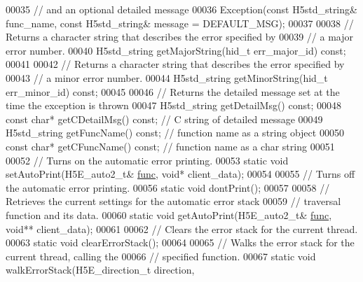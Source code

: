 \begin{DoxyCode}
00035         \textcolor{comment}{// and an optional detailed message}
00036         Exception(\textcolor{keyword}{const} H5std\_string& func\_name, \textcolor{keyword}{const} H5std\_string& message = DEFAULT\_MSG);
00037 
00038         \textcolor{comment}{// Returns a character string that describes the error specified by}
00039         \textcolor{comment}{// a major error number.}
00040         H5std\_string getMajorString(hid\_t err\_major\_id) \textcolor{keyword}{const};
00041 
00042         \textcolor{comment}{// Returns a character string that describes the error specified by}
00043         \textcolor{comment}{// a minor error number.}
00044         H5std\_string getMinorString(hid\_t err\_minor\_id) \textcolor{keyword}{const};
00045 
00046         \textcolor{comment}{// Returns the detailed message set at the time the exception is thrown}
00047         H5std\_string getDetailMsg() \textcolor{keyword}{const};
00048         \textcolor{keyword}{const} \textcolor{keywordtype}{char}* getCDetailMsg() \textcolor{keyword}{const};   \textcolor{comment}{// C string of detailed message}
00049         H5std\_string getFuncName() \textcolor{keyword}{const};    \textcolor{comment}{// function name as a string object}
00050         \textcolor{keyword}{const} \textcolor{keywordtype}{char}* getCFuncName() \textcolor{keyword}{const};    \textcolor{comment}{// function name as a char string}
00051 
00052         \textcolor{comment}{// Turns on the automatic error printing.}
00053         \textcolor{keyword}{static} \textcolor{keywordtype}{void} setAutoPrint(H5E\_auto2\_t& \hyperlink{structfunc}{func}, \textcolor{keywordtype}{void}* client\_data);
00054 
00055         \textcolor{comment}{// Turns off the automatic error printing.}
00056         \textcolor{keyword}{static} \textcolor{keywordtype}{void} dontPrint();
00057 
00058         \textcolor{comment}{// Retrieves the current settings for the automatic error stack}
00059         \textcolor{comment}{// traversal function and its data.}
00060         \textcolor{keyword}{static} \textcolor{keywordtype}{void} getAutoPrint(H5E\_auto2\_t& \hyperlink{structfunc}{func}, \textcolor{keywordtype}{void}** client\_data);
00061 
00062         \textcolor{comment}{// Clears the error stack for the current thread.}
00063         \textcolor{keyword}{static} \textcolor{keywordtype}{void} clearErrorStack();
00064 
00065         \textcolor{comment}{// Walks the error stack for the current thread, calling the}
00066         \textcolor{comment}{// specified function.}
00067         \textcolor{keyword}{static} \textcolor{keywordtype}{void} walkErrorStack(H5E\_direction\_t direction,

\end{DoxyCode}

